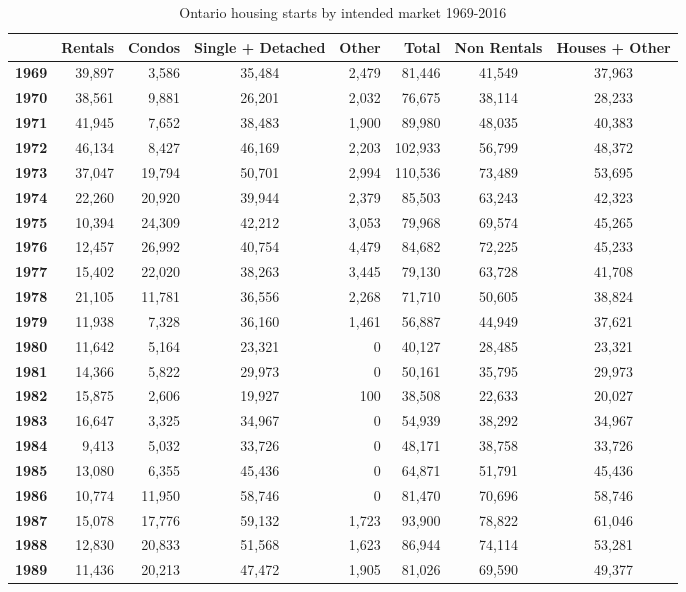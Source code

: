 \begin{table}[h]
\caption{Ontario housing starts by intended market 1969-2016}
{\footnotesize
\begin{tabular}{@{}>{\bfseries}r r r c r r c c@{}}
\toprule
 & Rentals & Condos & Single + Detached & Other & Total & Non Rentals & Houses + Other \\
\midrule
1969 & 39,897 & 3,586 & 35,484 & 2,479 & 81,446 & 41,549 & 37,963 \\
1970 & 38,561 & 9,881 & 26,201 & 2,032 & 76,675 & 38,114 & 28,233 \\
1971 & 41,945 & 7,652 & 38,483 & 1,900 & 89,980 & 48,035 & 40,383 \\
1972 & 46,134 & 8,427 & 46,169 & 2,203 & 102,933 & 56,799 & 48,372 \\
1973 & 37,047 & 19,794 & 50,701 & 2,994 & 110,536 & 73,489 & 53,695 \\
1974 & 22,260 & 20,920 & 39,944 & 2,379 & 85,503 & 63,243 & 42,323 \\
1975 & 10,394 & 24,309 & 42,212 & 3,053 & 79,968 & 69,574 & 45,265 \\
1976 & 12,457 & 26,992 & 40,754 & 4,479 & 84,682 & 72,225 & 45,233 \\
1977 & 15,402 & 22,020 & 38,263 & 3,445 & 79,130 & 63,728 & 41,708 \\
1978 & 21,105 & 11,781 & 36,556 & 2,268 & 71,710 & 50,605 & 38,824 \\
1979 & 11,938 & 7,328 & 36,160 & 1,461 & 56,887 & 44,949 & 37,621 \\
1980 & 11,642 & 5,164 & 23,321 & 0 & 40,127 & 28,485 & 23,321 \\
1981 & 14,366 & 5,822 & 29,973 & 0 & 50,161 & 35,795 & 29,973 \\
1982 & 15,875 & 2,606 & 19,927 & 100 & 38,508 & 22,633 & 20,027 \\
1983 & 16,647 & 3,325 & 34,967 & 0 & 54,939 & 38,292 & 34,967 \\
1984 & 9,413 & 5,032 & 33,726 & 0 & 48,171 & 38,758 & 33,726 \\
1985 & 13,080 & 6,355 & 45,436 & 0 & 64,871 & 51,791 & 45,436 \\
1986 & 10,774 & 11,950 & 58,746 & 0 & 81,470 & 70,696 & 58,746 \\
1987 & 15,078 & 17,776 & 59,132 & 1,723 & 93,900 & 78,822 & 61,046 \\
1988 & 12,830 & 20,833 & 51,568 & 1,623 & 86,944 & 74,114 & 53,281 \\
1989 & 11,436 & 20,213 & 47,472 & 1,905 & 81,026 & 69,590 & 49,377 \\

\end{tabular}}
\end{table}
